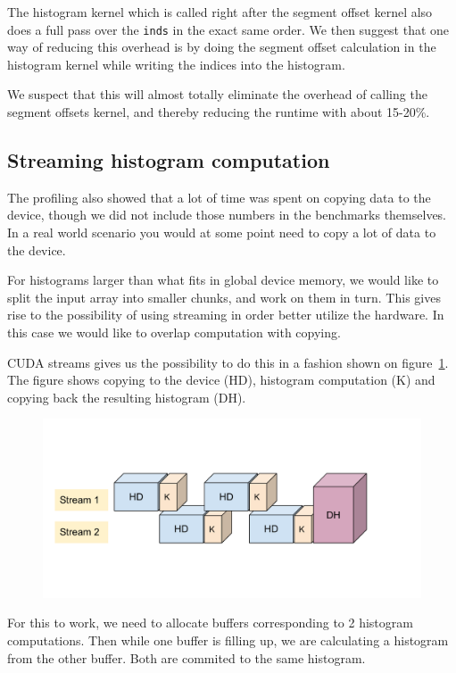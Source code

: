 \documentclass[12pt, a4paper, hidelinks]{article}
\renewcommand{\tt}[1]{\texttt{#1}}
\begin{document}
The histogram kernel which is called right after the segment offset kernel also does a full
pass over the \tt{inds} in the exact same order. We then suggest that one way of reducing
this overhead is by doing the segment offset calculation in the histogram kernel while
writing the indices into the histogram.

We suspect that this will almost totally eliminate the overhead of calling the segment
offsets kernel, and thereby reducing the runtime with about 15-20\%.

\subsection{Streaming histogram computation}
The profiling also showed that a lot of time was spent on copying data to the device,
though we did not include those numbers in the benchmarks themselves. In a real
world scenario you would at some point need to copy a lot of data to the device.

For histograms larger than what fits in global device memory, we would like to split
the input array into smaller chunks, and work on them in turn.
This gives rise to the possibility of using streaming in order better utilize the hardware.
In this case we would like to overlap computation with copying.

CUDA streams gives us the possibility to do this in a fashion shown on figure~\ref{fig:cuda-stream}.
The figure shows copying to the device (HD),
histogram computation (K) and copying back the resulting histogram (DH).

\begin{figure}[htpb]
    \centering
    \includegraphics[width=0.8\linewidth]{img/cuda-stream.pdf}
    \label{fig:cuda-stream}
\end{figure}

For this to work, we need to allocate buffers corresponding to 2 histogram computations.
Then while one buffer is filling up, we are calculating a histogram from the other
buffer. Both are commited to the same histogram.
\end{document}

